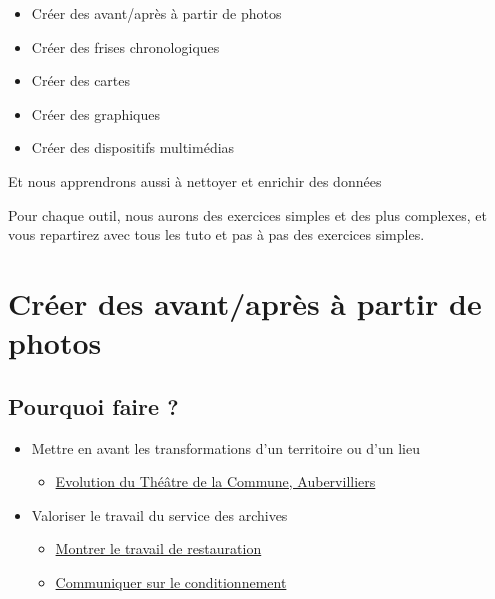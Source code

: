 \documentclass[
  letterpaper,
  DIV=11,
  numbers=noendperiod]{scrartcl}
\providecommand{\tightlist}{%
  \setlength{\itemsep}{0pt}\setlength{\parskip}{0pt}}\usepackage{longtable,booktabs,array}
\begin{document}
\begin{itemize}
\item
  Créer des avant/après à partir de photos
\item
  Créer des frises chronologiques
\item
  Créer des cartes
\item
  Créer des graphiques
\item
  Créer des dispositifs multimédias
\end{itemize}

Et nous apprendrons aussi à nettoyer et enrichir des données

Pour chaque outil, nous aurons des exercices simples et des plus
complexes, et vous repartirez avec tous les tuto et pas à pas des
exercices simples.

\section{Créer des avant/après à partir de
photos}\label{cruxe9er-des-avantapruxe8s-uxe0-partir-de-photos}

\subsection{Pourquoi faire ?}\label{pourquoi-faire}

\begin{itemize}
\item
  Mettre en avant les transformations d'un territoire ou d'un lieu

  \begin{itemize}
  \tightlist
  \item
    \href{https://archives.aubervilliers.fr/De-la-salle-des-fetes-au-Theatre-de-la-Commune}{Evolution
    du Théâtre de la Commune, Aubervilliers}
  \end{itemize}
\item
  Valoriser le travail du service des archives

  \begin{itemize}
  \item
    \href{https://www.archives13.fr/n/l-education-des-vers-a-soie/n:242}{Montrer
    le travail de restauration}
  \item
    \href{https://www.archives-loiret.fr/nouveau-batiment/les-archives-demenagent/en-attendant-le-demenagement}{Communiquer
    sur le conditionnement}
  \end{itemize}
\end{itemize}
\end{document}
